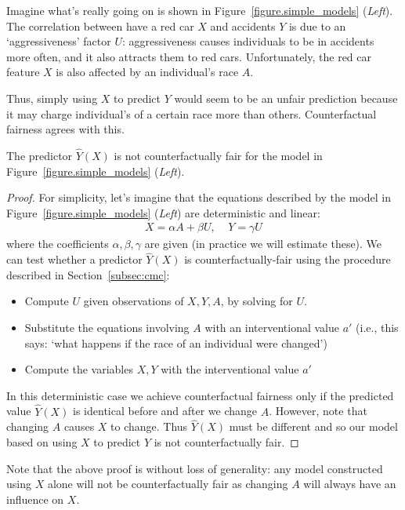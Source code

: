 Imagine what's really going on is shown in Figure~\ref{figure.simple_models} (\emph{Left}). The correlation between have a red car $X$ and accidents $Y$ is due to an `aggressiveness' factor $U$: aggressiveness causes individuals to be in accidents more often, and it also attracts them to red cars. Unfortunately, the red car feature $X$ is also affected by an individual's race $A$. 

Thus, simply using $X$ to predict $Y$ would seem to be an unfair prediction because it may charge individual's of a certain race more than others. Counterfactual fairness agrees with this. 

\begin{lem}
The predictor $\hat{Y}(X)$ is not counterfactually fair for the model in Figure~\ref{figure.simple_models} (\emph{Left}).
\end{lem}

\begin{proof}
For simplicity, let's imagine that the equations described by the model in Figure~\ref{figure.simple_models} (\emph{Left}) are deterministic and linear:
\begin{align}
X = \alpha A + \beta U, \;\;\;\; Y = \gamma U \nonumber
\end{align}
where the coefficients $\alpha,\beta,\gamma$ are given (in practice we will estimate these). We can test whether a predictor $\hat{Y}(X)$ is counterfactually-fair using the procedure described in Section~\ref{subsec:cmc}:
\begin{itemize}
\item Compute $U$ given observations of $X,Y,A$, by solving for $U$.
\item Substitute the equations involving $A$ with an interventional value $a'$ (i.e., this says: `what happens if the race of an individual were changed')
\item Compute the variables $X,Y$ with the interventional value $a'$
\end{itemize}
In this deterministic case we achieve counterfactual fairness only if the predicted value $\hat{Y}(X)$ is identical before and after we change $A$. However, note that changing $A$ causes $X$ to change. Thus $\hat{Y}(X)$ must be different and so our model based on using $X$ to predict $Y$ is not counterfactually fair.
\end{proof}
Note that the above proof is without loss of generality: any model constructed using $X$ alone will not be counterfactually fair as changing $A$ will always have an influence on $X$.


